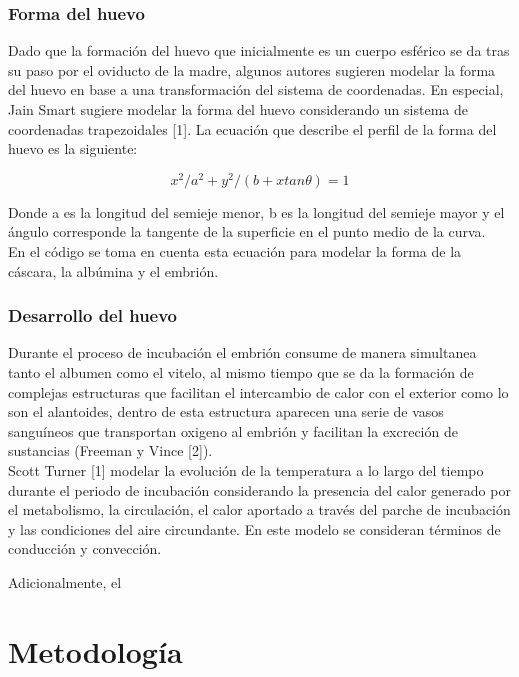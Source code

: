 \documentclass{article}
\begin{document}
	\subsubsection{Forma del huevo}
	Dado que la formación del huevo que inicialmente es un cuerpo esférico se da tras su paso por el oviducto de la madre, algunos autores sugieren modelar la forma del huevo en base a una transformación del sistema de coordenadas. En especial, Jain Smart sugiere modelar la forma del huevo considerando un sistema de coordenadas trapezoidales [1]. La ecuación que describe el perfil de la forma del huevo es la siguiente:
	
	\begin{equation}
		x^2/a^2+y^2/(b+xtan\theta)=1
	\end{equation}
	
	Donde a es la longitud del semieje menor, b es la longitud del semieje mayor y el ángulo corresponde la tangente de la superficie en el punto medio de la curva.	\\
	
	En el código se toma en cuenta esta ecuación para modelar la forma de la cáscara, la albúmina y el embrión.	
	
	\subsubsection{Desarrollo del huevo}
	
	Durante el proceso de incubación el embrión consume de manera simultanea tanto el albumen como el vitelo, al mismo tiempo que se da la formación de complejas estructuras que facilitan el intercambio de calor con el exterior como lo son el alantoides, dentro de esta estructura aparecen una serie de vasos sanguíneos que transportan oxigeno al embrión y facilitan la excreción de sustancias (Freeman y Vince [2]). \\
	
	Scott Turner [1] modelar la evolución de la temperatura a lo largo del tiempo durante el periodo de incubación considerando la presencia del calor generado por el metabolismo, la circulación, el calor aportado a través del parche de incubación y las condiciones del aire circundante. En este modelo se consideran términos de conducción y convección.
	
	Adicionalmente, el 
			
	\section{Metodología}
	
\end{document}
